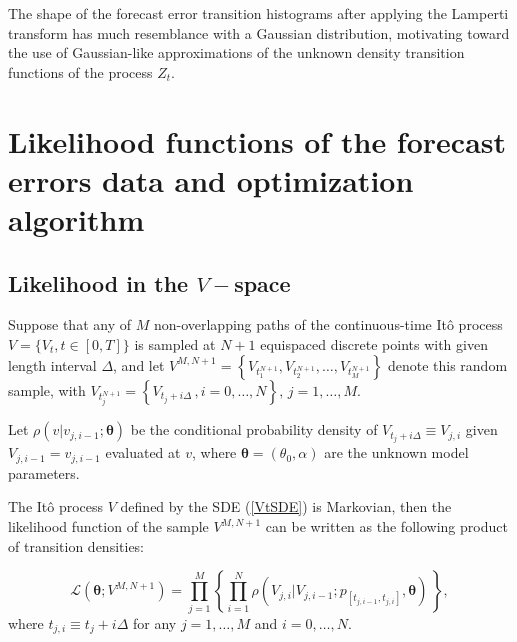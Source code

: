 \documentclass[11pt]{article}
\theoremstyle{definition}
\begin{document}
The shape of the forecast error transition histograms after applying the Lamperti transform has much resemblance with a Gaussian distribution, motivating toward the use of Gaussian-like approximations of the unknown density transition functions of the process $Z_t$.




\section{ Likelihood functions of the forecast errors data and optimization algorithm} \label{Section_5} 

\subsection{Likelihood in the $V-$space}

Suppose that any of $M$ non-overlapping paths of the continuous-time It\^{o} process $V = \{ V_t, t  \in [0,T] \}$ is sampled at $N + 1$ equispaced discrete points with given length interval $\Delta$, and let $ V^{M,N + 1}=\left\{ V_{t_1^{N + 1}} , V_{t_2^{N + 1}} ,\ldots , V_{t_M^{N + 1}} \right\}$ denote this random sample, with $V_{t_j^{N + 1}} =\left\{ V_{t_j + i \Delta}\,, i = 0, \ldots, N \right\}, \, j = 1, \ldots, M$. 

Let $\rho(v \vert v_{j, i-1} ; \bm{\theta})$ be the conditional probability density of $V_{t_j + i \Delta} \equiv V_{j, i}$ given $V_{j, i-1} = v_{j, i-1}$ evaluated at $v$, where $\bm{\theta} = (\theta_0, \alpha)$ are the unknown model parameters.

The It\^{o} process $V$ defined by the SDE (\ref{VtSDE}) is Markovian, then the likelihood function of the sample $ V^{M,N + 1}$ can be written as the following product of transition densities:  

\begin{equation}
\mathcal{L}(\bm{\theta}; V^{M,N +1}) = \prod\limits_{j=1}^M \left\{ \prod\limits_{i=1}^N \rho ( {V_{j, i}| V_{j, i-1}} ; p_{[t_{j,  i-1}, t_{j , i} ]},  \bm{\theta} )  \,  \right\},
\label{likelihood}
\end{equation}
where $t_{j ,i} \equiv  t_j + i \Delta$ for any $j = 1, \ldots, M$ and $i = 0, \ldots, N$. \\
\end{document}
